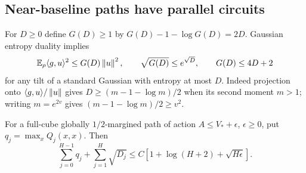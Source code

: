 \subsection{Near-baseline paths have parallel circuits}

For $D\ge0$ define $G(D)\ge1$ by
$G(D)-1-\log G(D)=2D$. Gaussian entropy duality implies
\begin{equation}\label{ac-gaussian-gain}
 \mathbb E_\rho\langle g,u\rangle^2\le G(D)\left\lVert u\right\rVert^2,
 \qquad \sqrt{G(D)}\le e^{\sqrt D},\qquad G(D)\le4D+2
\end{equation}
for any tilt of a standard Gaussian with entropy at most $D$.
Indeed projection onto $\langle g,u\rangle/\left\lVert u\right\rVert$ gives
$D\ge(m-1-\log m)/2$ when its second moment $m>1$; writing
$m=e^{2v}$ gives $(m-1-\log m)/2\ge v^2$.

\begin{lemma}\label{ac-occupation}
For a full-cube globally $1/2$-margined path of action
$A\le V_*+\epsilon$, $\epsilon\ge0$, put
$q_j=\max_xQ_j(x,x)$. Then
\[
 \sum_{j=0}^{H-1}q_j+\sum_{j=1}^H\sqrt{D_j}
          \le C[1+\log(H+2)+\sqrt{H\epsilon}].
\]
\end{lemma}
